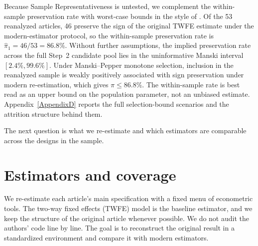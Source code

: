 Because Sample Representativeness is untested, we complement the within-sample preservation rate with worst-case bounds in the style of \textcite{manski1989anatomy}. Of the 53 reanalyzed articles, 46 preserve the sign of the original TWFE estimate under the modern-estimator protocol, so the within-sample preservation rate is $\hat\pi_1 = 46/53 = 86.8\%$. Without further assumptions, the implied preservation rate across the full Step~2 candidate pool lies in the uninformative Manski interval $[2.4\%, 99.6\%]$. Under Manski--Pepper monotone selection, inclusion in the reanalyzed sample is weakly positively associated with sign preservation under modern re-estimation, which gives $\pi \leq 86.8\%$. The within-sample rate is best read as an upper bound on the population parameter, not an unbiased estimate. Appendix~\ref{AppendixD} reports the full selection-bound scenarios and the attrition structure behind them.

The next question is what we re-estimate and which estimators are comparable across the designs in the sample.


\section{Estimators and coverage}

We re-estimate each article's main specification with a fixed menu of econometric tools. The two-way fixed effects (TWFE) model is the baseline estimator, and we keep the structure of the original article whenever possible. We do not audit the authors' code line by line. The goal is to reconstruct the original result in a standardized environment and compare it with modern estimators.

